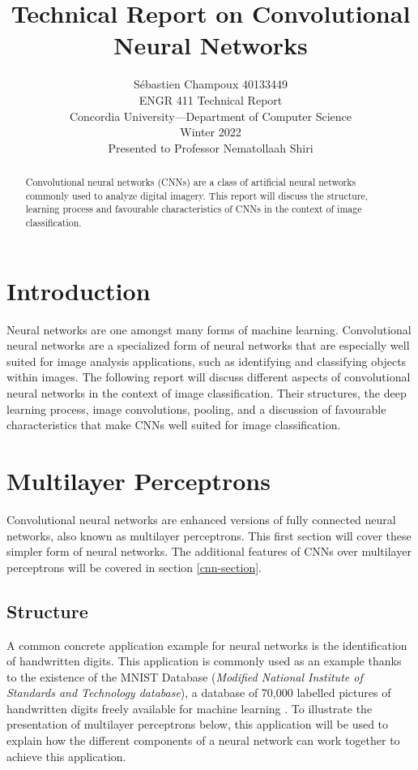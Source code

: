 ﻿\documentclass[12pt,a4paper,notitlepage]{article}
\begin{document}
\title{Technical Report on Convolutional Neural Networks}
\author{Sébastien Champoux 40133449
\\ ENGR 411 Technical Report
\\ Concordia University—Department of Computer Science
\\ Winter 2022
\\ Presented to Professor Nematollaah Shiri
}
\maketitle

\begin{abstract}
Convolutional neural networks (CNNs) are a class of artificial neural networks commonly used to analyze digital imagery. This report will discuss the structure, learning process and favourable characteristics of CNNs in the context of image classification.
\end{abstract}

\clearpage
\tableofcontents

\clearpage
\listoffigures

\clearpage

\section{Introduction}
Neural networks are one amongst many forms of machine learning. Convolutional neural networks are a specialized form of neural networks  that are especially well suited for image analysis applications, such as identifying and classifying objects within images. The following report will discuss different aspects of convolutional neural networks  in the context of image classification. Their structures, the deep learning process, image convolutions, pooling, and a discussion of favourable characteristics that make CNNs well suited for image classification.

\section{Multilayer Perceptrons}\label{fully-connected-networks}
Convolutional neural networks are enhanced versions of fully connected neural networks, also known as multilayer perceptrons. This first section will cover these simpler form of neural networks. The additional features of CNNs over multilayer perceptrons will be covered in section \ref{cnn-section}.

\subsection{Structure}
A common concrete application example for neural networks is the identification of handwritten digits. This application is commonly used as an example thanks to the existence of the MNIST Database (\textit{Modified National Institute of Standards and Technology database}), a database of 70,000 labelled pictures of handwritten digits freely available for machine learning \cite{lecun_mnist_1998}. To illustrate the presentation of multilayer perceptrons below, this application will be used to explain how the different components of a neural network can work together to achieve this application.
\end{document}
